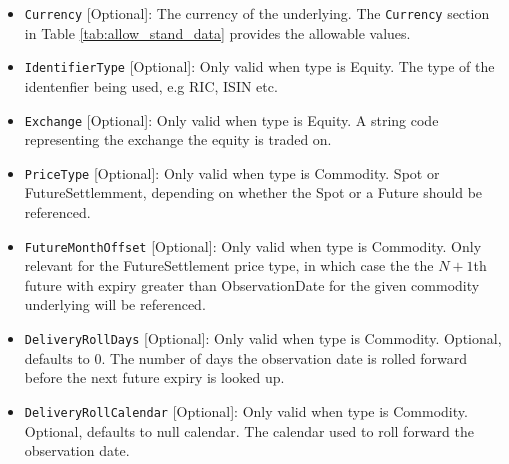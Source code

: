 \begin{itemize}
\item \lstinline!Currency! [Optional]:
The currency of the underlying. The \lstinline!Currency! section in Table \ref{tab:allow_stand_data} provides the allowable values.

\item \lstinline!IdentifierType! [Optional]:
Only valid when type is Equity. The type of the identenfier being used, e.g RIC, ISIN etc.

\item \lstinline!Exchange! [Optional]:
Only valid when type is Equity. A string code representing the exchange the equity is traded on.

\item \lstinline!PriceType! [Optional]:
Only valid when type is Commodity.  Spot or FutureSettlemment, depending on whether the Spot or a Future should be referenced.

\item \lstinline!FutureMonthOffset! [Optional]:
Only valid when type is Commodity. Only relevant for the FutureSettlement price type, in which case the the $N+1$th future with
  expiry greater than ObservationDate for the given commodity underlying will be referenced.

\item \lstinline!DeliveryRollDays! [Optional]:
Only valid when type is Commodity. Optional, defaults to 0. The number of days the observation date is rolled forward before the
  next future expiry is looked up.

\item \lstinline!DeliveryRollCalendar! [Optional]:
Only valid when type is Commodity. Optional, defaults to null calendar. The calendar used to roll forward the observation date.


\end{itemize}
